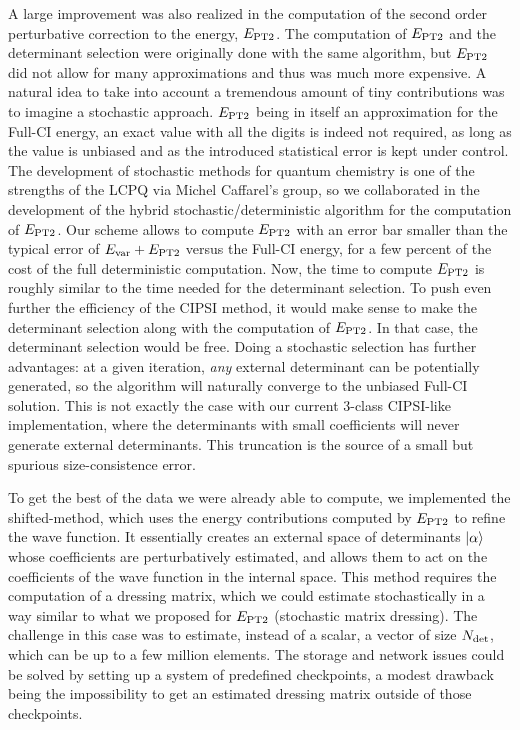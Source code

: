 \documentclass[12pt,a4paper]{report}
\begin{document}
A large improvement was also realized in the computation of the second order
perturbative correction to the energy, $E_\text{PT2}$. The computation of
$E_\text{PT2}$ and the determinant selection were originally done with the same algorithm,
but $E_\text{PT2}$ did not allow for many
approximations and thus was much more expensive. A natural idea to take into account
a tremendous amount of tiny contributions was to imagine a stochastic approach.
$E_\text{PT2}$ being in itself an approximation for the Full-CI energy,
an exact value with all the digits is indeed not required, as long as the
value is unbiased and as the introduced statistical error is kept under control.
The development of
stochastic methods for quantum chemistry is one of the strengths of the LCPQ
via Michel Caffarel's group, so we collaborated in the development of the
hybrid stochastic/deterministic algorithm for the computation of $E_\text{PT2}$.  Our
scheme allows to compute $E_\text{PT2}$ with an error bar smaller than the typical
error of $E_{\text{var}} + E_\text{PT2}$ versus the Full-CI energy, for a few percent
of the cost of the full deterministic computation.  Now, the time to compute
$E_\text{PT2}$ is roughly similar to the time needed for the determinant selection.  To
push even further the efficiency of the CIPSI method, it would make sense to
make the determinant selection along with the computation of $E_\text{PT2}$. In that
case, the determinant selection would be free.  Doing a stochastic selection
has further advantages: at a given iteration, \emph{any} external determinant
can be potentially generated, so the algorithm will naturally converge to the
unbiased Full-CI solution. This is not exactly the case with our current 3-class CIPSI-like
implementation, where the determinants with small coefficients will never
generate external determinants. This truncation is the source of a small but
spurious size-consistence error.

To get the best of the data we were already able to compute, we implemented the shifted-\Bk method, which uses the energy contributions computed by $E_\text{PT2}$ to refine the wave function. It essentially creates an external space of determinants ${\ket{\alpha}}$ whose coefficients are perturbatively estimated, and allows them to act on the coefficients of the wave function in the internal space. This method requires the computation of a dressing matrix, which we could estimate stochastically in a way similar to what we proposed for $E_\text{PT2}$ (stochastic matrix dressing).
The challenge in this case was to estimate, instead of a scalar, a vector of size ${N_\text{det}}$, which can be up to a few million elements. The storage and network issues could be solved by setting up a system of predefined checkpoints, a modest drawback being the impossibility to get an estimated dressing matrix outside of those checkpoints.
\end{document}

